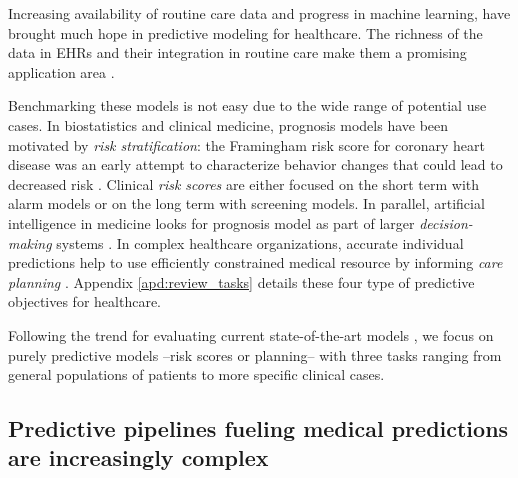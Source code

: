 \documentclass[french,12pt,twoside,a4paper]{book}
\begin{document}

Increasing availability of routine care data and progress in
machine learning, have brought much hope in predictive modeling for healthcare.
The richness of the data in EHRs and their integration in routine care make them
a promising application area \citep{raghupathi2014big}.

Benchmarking these models is not easy due to the wide range of potential use
cases.
In biostatistics and clinical medicine, prognosis models have been motivated by
\emph{risk stratification}: the Framingham risk score for coronary heart disease
was an early attempt to characterize behavior changes that could lead to
decreased risk \citep{brand1976multivariate}. Clinical \emph{risk scores} are
either focused on the short term with alarm models
\citep{tang2007global,rothman2013development,wong2021external} or on the long
term with screening models. In parallel, artificial intelligence in medicine
looks for prognosis model as part of larger \emph{decision-making} systems
\citep{Szolovits1982artificial}. In complex healthcare organizations, accurate
individual predictions help to use efficiently constrained medical resource by
informing \emph{care planning} \citep{topol2019high}. Appendix
\ref{apd:review_tasks} details these four type of predictive objectives for
healthcare.

Following the trend for evaluating current state-of-the-art models
\citep{wornow2023shaky}, we focus on purely predictive models --risk scores or
planning-- with three tasks ranging from general populations of patients to
more specific clinical cases.

\subsection{Predictive pipelines fueling medical predictions are increasingly
  complex}%
\label{subsec:predictive_models:complex_data}%
\end{document}
